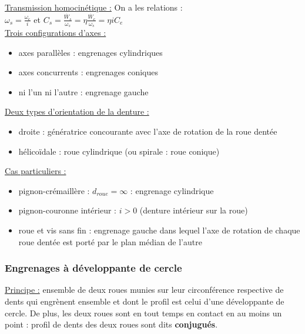 \documentclass[../main.tex]{subfiles}
\begin{document}
\quad \underline{Transmission homocinétique :} On a les relations : \\
$\omega_s = \frac{\omega_e}{i}$ et $C_s = \frac{\dot{W_s}}{\omega_s} = \eta \frac{\dot{W_e}}{\omega_s} = \eta i C_e$\\

\quad \underline{Trois configurations d'axes :}\\
\begin{itemize}
    \item axes parallèles : engrenages cylindriques\\
    \item axes concurrents : engrenages coniques\\
    \item ni l'un ni l'autre : engrenage gauche\\
\end{itemize}

\quad \underline{Deux types d'orientation de la denture :}\\
\begin{itemize}
    \item droite : génératrice concourante avec l'axe de rotation de la roue dentée\\
    \item hélicoïdale : roue cylindrique (ou spirale : roue conique)\\
\end{itemize}

\quad \underline{Cas particuliers :}\\
\begin{itemize}
    \item pignon-crémaillère : $d_{roue} = \infty$ : engrenage cylindrique\\
    \item pignon-couronne intérieur : $i>0$ (denture intérieur sur la roue)\\
    \item roue et vis sans fin : engrenage gauche dans lequel l'axe de rotation de chaque roue dentée est porté par le plan médian de l'autre\\
\end{itemize}

\subsubsection{Engrenages à développante de cercle}
\quad \underline{Principe :} ensemble de deux roues munies sur leur circonférence respective de dents qui engrènent ensemble et dont le profil est celui d'une développante de cercle. De plus, les deux roues sont en tout temps en contact en au moins un point : profil de dents des deux roues sont dits \textbf{conjugués}.\\
\end{document}
